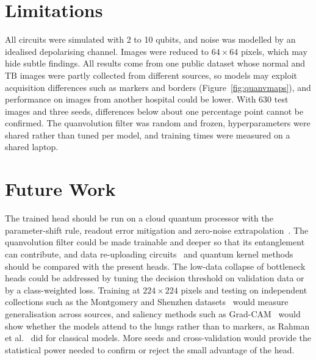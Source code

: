 \section{Limitations}
All circuits were simulated with 2 to 10 qubits, and noise was modelled by
an idealised depolarising channel. Images were reduced to $64 \times 64$
pixels, which may hide subtle findings. All results come from one public
dataset whose normal and TB images were partly collected from different
sources, so models may exploit acquisition differences such as markers and
borders (Figure~\ref{fig:quanvmaps}), and performance on images from another
hospital could be lower. With 630 test images and three seeds, differences
below about one percentage point cannot be confirmed. The quanvolution
filter was random and frozen, hyperparameters were shared rather than tuned
per model, and training times were measured on a shared laptop.

\section{Future Work}
The trained \cq{} head should be run on a cloud quantum processor with the
parameter-shift rule, readout error mitigation and zero-noise
extrapolation~\cite{temme2017}. The quanvolution filter could be made
trainable and deeper so that its entanglement can contribute, and data
re-uploading circuits~\cite{perezsalinas2020} and quantum kernel
methods~\cite{havlicek2019} should be compared with the present heads. The
low-data collapse of bottleneck heads could be addressed by tuning the
decision threshold on validation data or by a class-weighted loss. Training
at $224 \times 224$ pixels and testing on independent collections such as
the Montgomery and Shenzhen datasets~\cite{jaeger2014} would measure
generalisation across sources, and saliency methods such as
Grad-CAM~\cite{selvaraju2017} would show whether the models attend to the
lungs rather than to markers, as Rahman et al.~\cite{rahman2020} did for
classical models. More seeds and cross-validation would provide the
statistical power needed to confirm or reject the small advantage of the
\cq{} head.
